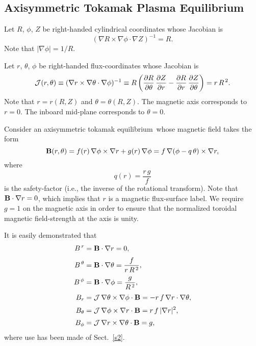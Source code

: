\documentclass[12pt,prb,aps]{revtex4-1}
\begin{document}
\subsection{Axisymmetric Tokamak Plasma Equilibrium}\label{s3}
Let $R$, $\phi$, $Z$ be right-handed cylindrical coordinates whose Jacobian 
is
\begin{equation}
(\nabla R\times \nabla\phi\cdot\nabla Z)^{-1} = R.
\end{equation}
Note that $|\nabla\phi|=1/R$. 

Let $r$, $\theta$, $\phi$ be right-handed flux-coordinates whose
Jacobian is\,\cite{connor,bussac}
\begin{equation}\label{jac}
{\cal J}(r,\theta)\equiv (\nabla r\times \nabla\theta\cdot\nabla\phi)^{-1} \equiv R\left(\frac{\partial R}{\partial\theta}\,\frac{\partial Z}{\partial r} -\frac{\partial R}{\partial r}\,\frac{\partial Z}{\partial \theta}\right)= r\,R^{\,2}.
\end{equation}
Note that $r=r(R,Z)$ and $\theta=\theta(R,Z)$. 
The magnetic axis corresponds to $r=0$. The inboard mid-plane corresponds to $\theta=0$. 

Consider an axisymmetric tokamak equilibrium\,\cite{gs1} whose magnetic field takes the form\,\cite{connor,am1}
\begin{equation}
{\bf B}(r,\theta) = f(r)\,\nabla\phi\times \nabla r + g(r)\,\nabla\phi = f\,\nabla(\phi-q\,\theta)\times \nabla r,
\end{equation}
where
\begin{equation}\label{q}
q(r) = \frac{r\,g}{f}
\end{equation}
is the safety-factor (i.e., the inverse of the rotational transform). Note that ${\bf B}\cdot\nabla r=0$, which implies that $r$ is a magnetic flux-surface label.
We require $g=1$ on the magnetic axis in order to ensure that the normalized toroidal magnetic field-strength at the  axis is unity.  

It is easily demonstrated that
\begin{align}
B^{\,r}&={\bf B}\cdot\nabla r= 0,\label{bup1}\\[0.5ex]
B^{\,\theta} &={\bf B}\cdot\nabla \theta= \frac{f}{r\,R^{\,2}},\label{bup2}\\[0.5ex]
B^{\,\phi} &={\bf B}\cdot\nabla \phi= \frac{g}{R^{\,2}},\label{bup3}\\[0.5ex]
B_r &={\cal J}\,\nabla\theta\times\nabla\phi\cdot{\bf B}= -r\,f\,\nabla r\cdot\nabla\theta,\label{bdown1}\\[0.5ex]
B_\theta &={\cal J}\,\nabla\phi\times\nabla r\cdot{\bf B}= r\,f\,|\nabla r|^2,\\[0.5ex]
B_\phi &={\cal J}\,\nabla r\times\nabla \theta \cdot{\bf B}= g,\label{bdown3}
\end{align}
where use has been made of Sect.~\ref{s2}. 
\end{document}
